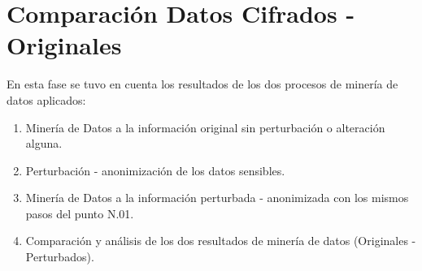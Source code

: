 \documentclass[a4paper,openright,12pt]{book}
\theoremstyle{definition}
\theoremstyle{remark}
\begin{document}

     \section{Comparación Datos Cifrados - Originales}
En esta fase se tuvo en cuenta los resultados de los dos procesos de minería de datos aplicados: 
\begin{enumerate}
	\item Minería de Datos a la información original sin perturbación o alteración alguna.
    \item Perturbación - anonimización de los datos sensibles.
    \item Minería de Datos a la información perturbada - anonimizada con los mismos pasos del punto N.01.
	\item Comparación y análisis de los dos resultados de minería de datos (Originales - Perturbados).
\end{enumerate}
\end{document}
